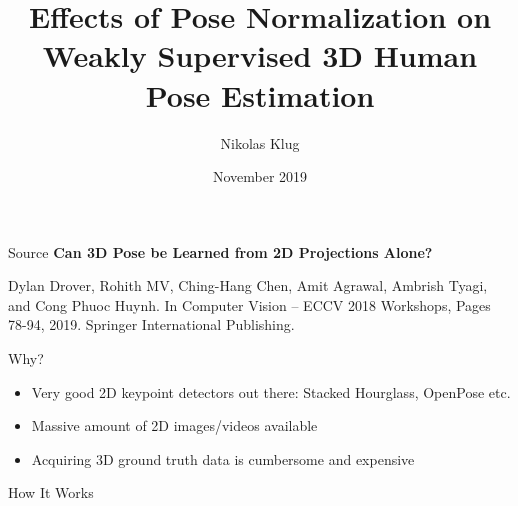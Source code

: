 \documentclass[8pt]{beamer}
\title[]{Effects of Pose Normalization on\\ Weakly Supervised 3D Human Pose Estimation}
\author[Nikolas Klug]{Nikolas Klug}
\institute[University of Augsburg]{University of Augsburg}
\date{\nth{6} November 2019}
\begin{document}
	{
	\begin{frame}
		\titlepage
	\end{frame}
	}
	\addtocounter{framenumber}{-1}

	\begin{frame}{Source}
		\textbf{Can 3D Pose be Learned from 2D Projections Alone?}\linebreak
		\begin{footnotesize}
			Dylan Drover, Rohith MV, Ching-Hang Chen, Amit Agrawal, Ambrish Tyagi, and Cong Phuoc Huynh.\linebreak
			In Computer Vision -- ECCV 2018 Workshops, Pages 78-94, 2019. Springer International Publishing.
		\end{footnotesize}
	\end{frame}

	\begin{frame}{Why?}
		\begin{itemize}
			\item Very good 2D keypoint detectors out there: Stacked Hourglass, OpenPose etc.
			\item Massive amount of 2D images/videos available
			\item Acquiring 3D ground truth data is cumbersome and expensive
		\end{itemize}
	\end{frame}

	\begin{frame}{How It Works}
		\begin{figure}
			\centering
		\end{figure}
	\end{frame}
\end{document}
